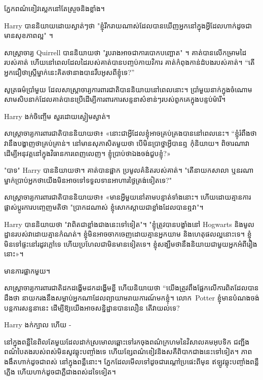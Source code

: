 {ភ្នែក​ពណ៌​ខៀវ​ស្លេក​នៅ​តែ​ស្រួច​និង​ខ្លាំង។

Harry បាននិយាយដោយស្ងាត់ៗថា "ខ្ញុំរីករាយណាស់ដែលបានឃើញអ្នកនៅក្នុងអ្វីដែលហាក់ដូចជាមានសុខភាពល្អ" ។

សាស្ត្រាចារ្យ Quirrell បាននិយាយថា "រូបរាងអាចជាការបោកបញ្ឆោត" ។ គាត់បានលើកម្រាមដៃរបស់គាត់ ហើយនៅពេលដែលដៃរបស់គាត់បានបញ្ចប់កាយវិការ គាត់កំពុងកាន់ដំបងរបស់គាត់។ “តើ​អ្នក​ជឿ​ថា​ស្ត្រី​ម្នាក់​នេះ​គិត​ថា​នាង​បាន​រឹបអូស​ពី​ខ្ញុំ​ទេ?”

សូត្រធម៌ប្រាំមួយ ដែលសាស្ត្រាចារ្យការពារជាតិបាននិយាយនៅពេលនោះ។ ប្រាំមួយ​នាក់​ក្នុង​ចំណោម​សាមសិប​នាក់​ដែល​គាត់​បាន​ប្រើ​ដើម្បី​ការពារ​ការ​សន្ទនា​សំខាន់ៗ​របស់​ពួកគេ​ក្នុង​បន្ទប់​ម៉ារី។

Harry ងក់ចិញ្ចើម សួរដោយស្ងៀមស្ងាត់។

សាស្ត្រាចារ្យ​ការពារ​ជាតិ​បាន​និយាយ​ថា​៖ «នោះ​ជា​អ្វី​ដែល​ខ្ញុំ​អាច​គ្រប់​គ្រង​បាន​នៅ​ពេល​នេះ។ “ខ្ញុំ​រំពឹង​ថា​វា​នឹង​បង្ហាញ​ថា​គ្រប់គ្រាន់។ នៅមានសុភាសិតមួយថា បើមិនប្រាថ្នាអ្វីបានឮ កុំនិយាយ។ ពិចារណាវាដើម្បីអនុវត្តនៅក្នុងវិធានការពេញលេញ។ ខ្ញុំ​ប្រាប់​ថា​ឯង​ចង់​ជួប​ខ្ញុំ?»

"បាទ" Harry បាននិយាយថា។ គាត់បានផ្អាក ប្រមូលគំនិតរបស់គាត់។ "តើនាយកសាលា ឬនរណាម្នាក់ប្រាប់អ្នកថាយើងមិនអាចទៅទទួលទានអាហារថ្ងៃត្រង់ទៀតទេ?"

សាស្ត្រាចារ្យ​ការពារ​ជាតិ​បាន​និយាយ​ថា​៖ «​មាន​អ្វី​មួយ​នៅ​តាម​បន្ទាត់​ទាំង​នោះ។ ហើយ​ដោយ​គ្មាន​ការ​ផ្លាស់​ប្តូរ​ការ​បញ្ចេញ​មតិ​ថា "ប្រាកដ​ណាស់ ខ្ញុំ​សោក​ស្តាយ​ជា​ខ្លាំង​ដែល​បាន​ឮ​វា"។

Harry បាននិយាយថា "វាពិតជាខ្លាំងជាងនេះទៅទៀត"។ "ខ្ញុំត្រូវបានបង្ខាំងនៅ Hogwarts និងមូលដ្ឋានរបស់វាដោយគ្មានកំណត់។ ខ្ញុំមិនអាចចាកចេញដោយគ្មានអ្នកយាម និងហេតុផលល្អនោះទេ។ ខ្ញុំ​មិន​ទៅ​ផ្ទះ​នៅ​រដូវ​ក្តៅ​ទេ ហើយ​ប្រហែល​ជា​មិន​មាន​ទៀត​ទេ។ ខ្ញុំ​សង្ឃឹម​ថា​នឹង​និយាយ​ជាមួយ​អ្នក​អំពី​រឿង​នោះ»។

មានការផ្អាកមួយ។

សាស្ត្រាចារ្យ​ការពារ​ជាតិ​ដក​ដង្ហើម​ដក​ដង្ហើម​ខ្លី ហើយ​និយាយ​ថា “យើង​ត្រូវ​ពឹង​ផ្អែក​លើ​ការ​ពិត​ដែល​បាន​ដឹង​ថា នាយក​រង​នឹង​សម្លាប់​អ្នក​ណា​ដែល​ព្យាយាម​រាយការណ៍​មក​ខ្ញុំ។ លោក~Potter ខ្ញុំមានបំណងចង់បន្តការសន្ទនានេះ ដើម្បីឱ្យយើងអាចសន្និដ្ឋានបានលឿន តើវាយល់ទេ?

Harry ងក់ក្បាល ហើយ -

នៅ​ក្នុង​ពន្លឺ​នៃ​ពិល​តែ​មួយ​ដែល​ដាក់​ស្រមោល​ឆ្ពោះ​ទៅ​រក​ចុង​ពណ៌​ក្រហម​នៃ​វិសាលគម​អុបទិក ជញ្ជីង​ពណ៌​បៃតង​របស់​ពស់​មិន​សូវ​ឆ្លុះ​បញ្ចាំង​ទេ ហើយ​ខ្សែ​ពណ៌​ខៀវ​និង​ស​គឺ​ពិបាក​ជាង​នេះ​ទៅ​ទៀត។ ភាពងងឹតហាក់ដូចជាពស់ នៅក្នុងពន្លឺនោះ។ ភ្នែក​ដែល​មើល​ទៅ​ដូច​ជា​រណ្តៅ​ប្រផេះ​ពី​មុន ឥឡូវ​ឆ្លុះ​បញ្ចាំង​ពន្លឺ​ភ្លើង ហើយ​ហាក់​ដូច​ជា​ភ្លឺ​ជាង​ពស់​ដទៃ​ទៀត។

}
